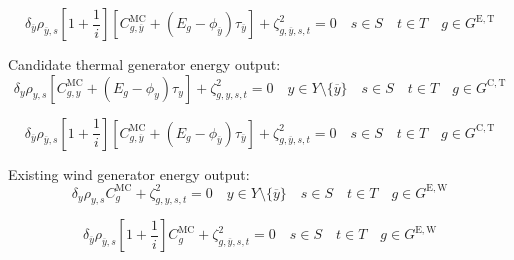 \documentclass{article}
\newcommand{\sGeneratorsExistingThermal}{G^{\mathrm{E,T}}}
\newcommand{\sGeneratorsExistingWind}{G^{\mathrm{E,W}}}
\newcommand{\sGeneratorsCandidateThermal}{G^{\mathrm{C,T}}}
\newcommand{\sYears}{Y}
\newcommand{\sScenarios}{S}
\newcommand{\sIntervals}{T}
\newcommand{\iGenerator}{g}
\newcommand{\iYear}{y}
\newcommand{\iYearTerminal}{\overline{\iYear}}
\newcommand{\iScenario}{s}
\newcommand{\iInterval}{t}
\newcommand{\cScenarioDuration}[1][\iYear,\iScenario]{\rho_{#1}}
\newcommand{\cMarginalCost}[1][\iGenerator,\iYear]{C^{\mathrm{MC}}_{#1}}
\newcommand{\cEmissionsIntensity}[1][\iGenerator]{E_{#1}}
\newcommand{\cInterestRate}{i}
\newcommand{\cDiscountRate}[1][\iYear]{\delta_{#1}}
\newcommand{\vBaseline}[1][\iYear]{\phi_{#1}}
\newcommand{\vPermitPrice}[1][\iYear]{\tau_{#1}}
\newcommand{\dGeneratorEnergyOutput}[1][\iGenerator,\iYear,\iScenario,\iInterval]{\zeta_{#1}^{2}}
\begin{document}
\begin{equation}
\cDiscountRate[\iYearTerminal] \cScenarioDuration[\iYearTerminal,\iScenario] \left[1 + \frac{1}{\cInterestRate}\right] \left[\cMarginalCost[\iGenerator,\iYearTerminal] + \left(\cEmissionsIntensity - \vBaseline[\iYearTerminal]\right)\vPermitPrice[\iYearTerminal] \right]  + \dGeneratorEnergyOutput[\iGenerator,\iYearTerminal,\iScenario,\iInterval] = 0 \quad \iScenario \in \sScenarios \quad \iInterval \in \sIntervals \quad \iGenerator \in \sGeneratorsExistingThermal
\end{equation}

Candidate thermal generator energy output:
\begin{equation}
\cDiscountRate \cScenarioDuration \left[\cMarginalCost + \left(\cEmissionsIntensity - \vBaseline\right)\vPermitPrice \right]  + \dGeneratorEnergyOutput = 0 \quad \iYear \in \sYears \setminus \{\iYearTerminal\} \quad \iScenario \in \sScenarios \quad \iInterval \in \sIntervals \quad \iGenerator \in \sGeneratorsCandidateThermal
\end{equation}

\begin{equation}
\cDiscountRate[\iYearTerminal] \cScenarioDuration[\iYearTerminal,\iScenario] \left[1 + \frac{1}{\cInterestRate}\right] \left[\cMarginalCost[\iGenerator,\iYearTerminal] + \left(\cEmissionsIntensity - \vBaseline[\iYearTerminal]\right)\vPermitPrice[\iYearTerminal] \right]  + \dGeneratorEnergyOutput[\iGenerator,\iYearTerminal,\iScenario,\iInterval] = 0 \quad \iScenario \in \sScenarios \quad \iInterval \in \sIntervals \quad \iGenerator \in \sGeneratorsCandidateThermal
\end{equation}

Existing wind generator energy output:
\begin{equation}
\cDiscountRate\cScenarioDuration \cMarginalCost[\iGenerator] + \dGeneratorEnergyOutput = 0 \quad \iYear \in \sYears \setminus \{\iYearTerminal\} \quad \iScenario \in \sScenarios \quad \iInterval \in \sIntervals \quad \iGenerator \in \sGeneratorsExistingWind
\end{equation}

\begin{equation}
\cDiscountRate[\iYearTerminal] \cScenarioDuration[\iYearTerminal,\iScenario] \left[1 + \frac{1}{\cInterestRate}\right] \cMarginalCost[\iGenerator] + \dGeneratorEnergyOutput[\iGenerator,\iYearTerminal,\iScenario,\iInterval] = 0 \quad \iScenario \in \sScenarios \quad \iInterval \in \sIntervals \quad \iGenerator \in \sGeneratorsExistingWind
\end{equation}
\end{document}
